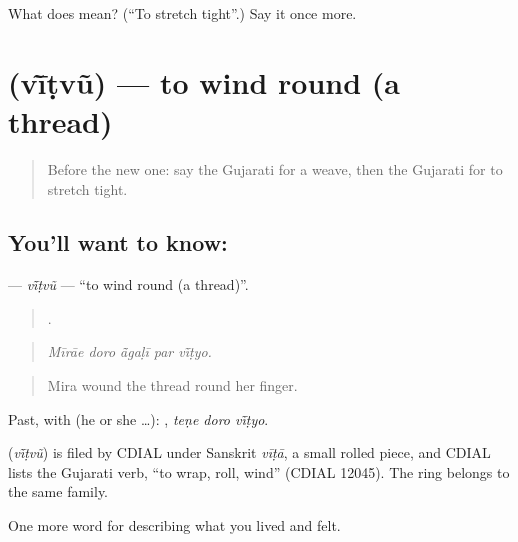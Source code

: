 \begin{tcolorbox}[breakable,colback=teal!4,colframe=teal!35!black,title={Before you move on}]
What does  mean? (\textquotedblleft{}To stretch tight\textquotedblright{}.) Say it once more.
\end{tcolorbox}
\section[\texorpdfstring{\gu{વીંટવું} (vī̃ṭvũ)}{વીંટવું (vī̃ṭvũ)}]{ (vī̃ṭvũ) — to wind round (a thread)}

\label{lesson:GU-C506-vintvu}



\begin{quote}
Before the new one: say the Gujarati for a weave, then the Gujarati for to stretch tight.
\end{quote}

\subsection*{You'll want to know: }
\textbf{} — \emph{vī̃ṭvũ} — \textquotedblleft{}to wind round (a thread)\textquotedblright{}.

\begin{quote}
    .
\end{quote}

\begin{quote}
\emph{Mīrāe doro ā̃gaḷī par vī̃ṭyo.}
\end{quote}

\begin{quote}
Mira wound the thread round her finger.
\end{quote}

Past, with  (he or she …):   , \emph{teṇe doro vī̃ṭyo}.

\begin{cousinweb}
\textbf{} (\emph{vī̃ṭvũ}) is filed by CDIAL under Sanskrit \emph{vīṭā}, a small rolled piece, and CDIAL lists the Gujarati verb, \textquotedblleft{}to wrap, roll, wind\textquotedblright{} (CDIAL 12045). The ring \textbf{} belongs to the same family.
\end{cousinweb}

\begin{grammarlens}[title={What you've built}]
One more word for describing what you lived and felt.
\end{grammarlens}

